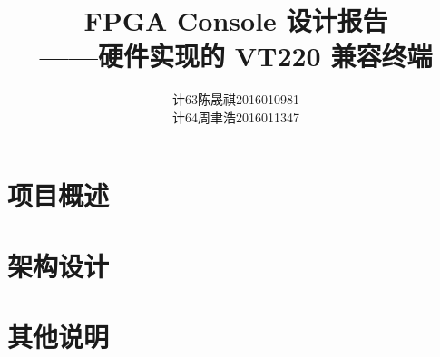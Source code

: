 \documentclass[fontset=fandol]{ctexart}
\newcommand{\arttitle}{FPGA Console 设计报告}
\newcommand{\artsubject}{硬件实现的 VT220 兼容终端}
\begin{document}
\title{{\bf\arttitle\\——\artsubject}}
\author{
计63\hspace{1em}陈晟祺\hspace{1em}2016010981 \\
计64\hspace{1em}周聿浩\hspace{1em}2016011347
}
\date{}
\maketitle

\tableofcontents

\section{项目概述}



\section{架构设计}





\section{其他说明}


\end{document}
